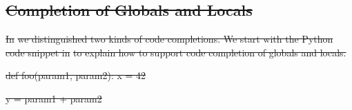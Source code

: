 \documentclass[sigplan,10pt,review,anonymous]{acmart}
\providecommand{\DIFdel}[1]{{\protect\color{red}\sout{#1}}}                      %
\providecommand{\DIFdelbegin}{} %
\providecommand{\DIFdelend}{} %
\begin{document}
\DIFdelbegin \subsection[]{\DIFdel{Completion of Globals and Locals}}
\addtocounter{subsection}{-1}%

\DIFdel{In }%
\DIFdel{we distinguished two kinds of code
completions. We start with the Python code snippet in
}%
\DIFdel{to explain how to support code
completion of globals and locals.
}\DIFdelend %

\DIFdelbegin %
\DIFdel{def foo(param1, param2):
    x = 42
}\DIFdelend %

\DIFdelbegin \DIFdel{y = param1 + param2
}\DIFdelend %
\end{document}
